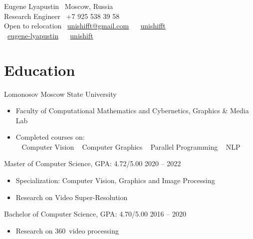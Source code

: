 \documentclass{tccv}
\newcommand{\sphere}{360\textdegree~}
\begin{document}
{ Eugene Lyapustin} \hfill \faMapMarker~Moscow, Russia \\
{\Large Research Engineer} \hfill \faPhone~+7 925 538 39 58 \\
Open to relocation \hfill \faEnvelope~\href{mailto:unishifft@gmail.com}{unishifft@gmail.com} ~ \faTelegramPlane~\href{https://t.me/unishifft}{unishifft}\\
\null\hfill \faLinkedin~\href{https://linkedin.com/in/eugene-lyapustin}{eugene-lyapustin} ~ \faGithub~\href{https://github.com/unishift/}{unishift}



\section{Education}

\begin{eventlist}

\evententry{}
     {Lomonosov Moscow State University}
     {}
     {}
\begin{itemize}
     \item Faculty of Computational Mathematics and Cybernetics, Graphics \& Media Lab
     \item Completed courses on:\\
          \faAngleRight~ Computer Vision\qquad
          \faAngleRight~ Computer Graphics\qquad
          \faAngleRight~ Parallel Programming\qquad
          \faAngleRight~ NLP
\end{itemize}

\evententry{}
     {}
     {Master of Computer Science, GPA: 4.72/5.00}
     {2020 -- 2022}
\begin{itemize}
     \item Specialization: Computer Vision, Graphics and Image Processing
     \item Research on Video Super-Resolution
\end{itemize}

\evententry{}
     {}
     {Bachelor of Computer Science, GPA: 4.70/5.00}
     {2016 -- 2020}
\begin{itemize}
          \item Research on \sphere video processing 
\end{itemize}

\end{eventlist}
\end{document}

